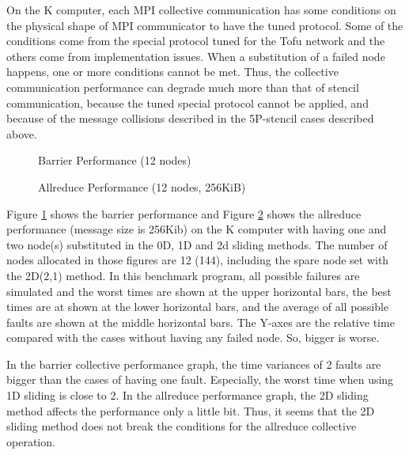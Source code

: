 \documentclass[10pt,conference,a4paper,fleqn]{IEEEtran}
\begin{document}
On the K computer, each MPI collective communication has some
conditions on the physical shape of MPI communicator to have the tuned
protocol. Some of the conditions come from the special protocol tuned
for the Tofu network and the others come from implementation
issues. When a substitution of a failed node happens, one or more
conditions cannot be met. Thus, the collective communication
performance can degrade much more than that of stencil communication,
because the tuned special protocol cannot be applied, and because of
the message collisions described in the 5P-stencil cases described
above.

\begin{figure}[ht]
\begin{center}
  \caption{Barrier Performance (12  nodes)} 
  \label{fig:barrier-k}
\end{center}
\end{figure}

\begin{figure}[ht]
\begin{center}
  \caption{Allreduce Performance (12  nodes, 256KiB)} 
  \label{fig:allreduce-k}
\end{center}
\end{figure}

Figure \ref{fig:barrier-k} shows the barrier performance and Figure
\ref{fig:allreduce-k} shows the allreduce performance (message size is
256Kib) on the K computer with having one and two node(s) substituted
in the 0D, 1D and 2d sliding methods. The number of nodes allocated in
those figures are 12  (144), including the spare node set
with the 2D(2,1) method. In this benchmark program, all possible
failures are simulated and the worst times are shown at the upper
horizontal bars, the best times are at shown at the lower horizontal
bars, and the average of all possible faults are shown at the middle
horizontal bars. The Y-axes are the relative time compared with the
cases without having any failed node. So, bigger is worse.

In the barrier collective performance graph, the time variances of 2
faults are bigger than the cases of having one fault. Especially, the
worst time when using 1D sliding is close to 2. In the allreduce
performance graph, the 2D sliding method affects the performance only
a little bit. Thus, it seems that the 2D sliding method does not break
the conditions for the allreduce collective operation.
\end{document}
